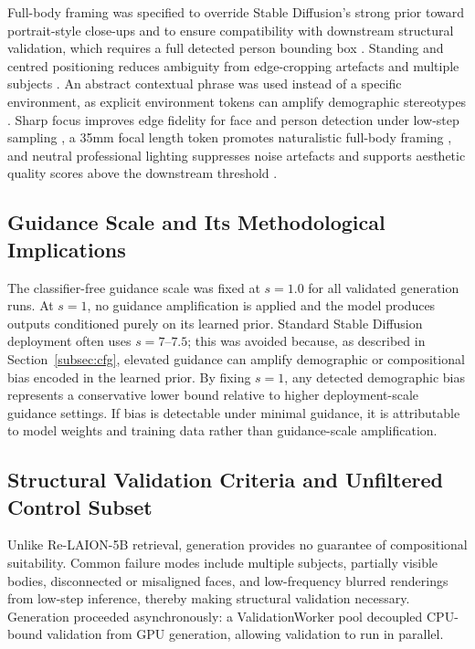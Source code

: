 Full-body framing was specified to override Stable Diffusion's strong prior toward portrait-style close-ups \cite{Rombach_2022_CVPR} and to ensure compatibility with downstream structural validation, which requires a full detected person bounding box \cite{Chen_2023_T2ICompBench}. Standing and centred positioning reduces ambiguity from edge-cropping artefacts and multiple subjects \cite{Nichol_2022_GLIDE}. An abstract contextual phrase was used instead of a specific environment, as explicit environment tokens can amplify demographic stereotypes \cite{Luccioni_2023_AnalyzingSocietalRepresentationsDiffusionModels, Friedrich_2023_FairDiffusionInstructingTextToImage}. Sharp focus improves edge fidelity for face and person detection under low-step sampling \cite{Luo_2023_LCMLoRA}, a 35mm focal length token promotes naturalistic full-body framing \cite{Fang_2024_CameraTokens}, and neutral professional lighting suppresses noise artefacts and supports aesthetic quality scores above the downstream threshold \cite{Friedrich_2023_FairDiffusionInstructingTextToImage}.

\subsection{Guidance Scale and Its Methodological Implications}
\label{subsec:guidance_scale}

The classifier-free guidance scale was fixed at $s = 1.0$ for all validated generation runs. At $s = 1$, no guidance amplification is applied and the model produces outputs conditioned purely on its learned prior. Standard Stable Diffusion deployment often uses $s = 7$--$7.5$; this was avoided because, as described in Section~\ref{subsec:cfg}, elevated guidance can amplify demographic or compositional bias encoded in the learned prior. By fixing $s = 1$, any detected demographic bias represents a conservative lower bound relative to higher deployment-scale guidance settings. If bias is detectable under minimal guidance, it is attributable to model weights and training data rather than guidance-scale amplification.

\subsection{Structural Validation Criteria and Unfiltered Control Subset}
\label{subsec:structural_validation}

Unlike Re-LAION-5B retrieval, generation provides no guarantee of compositional suitability. Common failure modes include multiple subjects, partially visible bodies, disconnected or misaligned faces, and low-frequency blurred renderings from low-step inference, thereby making structural validation necessary. Generation proceeded asynchronously: a ValidationWorker pool decoupled CPU-bound validation from GPU generation, allowing validation to run in parallel.


